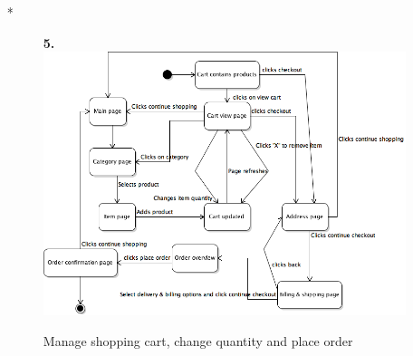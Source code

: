 \documentclass[UKenglish,12pt]{article}
\begin{document}
\begin{itemize}
\item[*] %
\begin{figure}[!htbp]
\textbf{5.\newline}
\centering
\includegraphics[scale=0.60,keepaspectratio]{Images/BuyProductsandChangeCart.png}
\caption{Manage shopping cart, change quantity and place order}
\end{figure}


\end{itemize}
\end{document}
